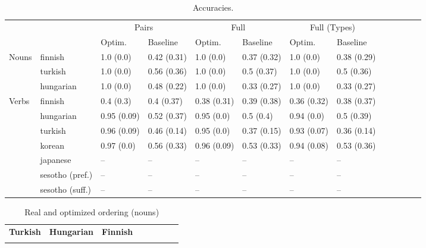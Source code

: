 \documentclass[11pt,letterpaper]{article}
\begin{document}
\begin{table}[]
    \centering
    \begin{tabular}{l|l|ll|lllllllll}
    &     &    \multicolumn{2}{c|}{Pairs} & \multicolumn{2}{c|}{Full} & \multicolumn{2}{c}{Full (Types)} \\
     &   &     Optim. & Baseline & Optim. & Baseline & Optim. & Baseline \\ \hline
Nouns & finnish  & 1.0 (0.0) & 0.42 (0.31) & 1.0 (0.0) & 0.37 (0.32) & 1.0 (0.0) & 0.38 (0.29) \\
 & turkish  & 1.0 (0.0) & 0.56 (0.36) & 1.0 (0.0) & 0.5 (0.37) & 1.0 (0.0) & 0.5 (0.36) \\
 & hungarian  & 1.0 (0.0) & 0.48 (0.22) & 1.0 (0.0) & 0.33 (0.27) & 1.0 (0.0) & 0.33 (0.27) \\
 \hline
Verbs & finnish  & 0.4 (0.3) & 0.4 (0.37) & 0.38 (0.31) & 0.39 (0.38) & 0.36 (0.32) & 0.38 (0.37) \\
 & hungarian  & 0.95 (0.09) & 0.52 (0.37) & 0.95 (0.0) & 0.5 (0.4) & 0.94 (0.0) & 0.5 (0.39) \\
 & turkish  & 0.96 (0.09) & 0.46 (0.14) & 0.95 (0.0) & 0.37 (0.15) & 0.93 (0.07) & 0.36 (0.14) \\
 & korean & 0.97 (0.0) & 0.56 (0.33) & 0.96 (0.09) & 0.53 (0.33) & 0.94 (0.08) & 0.53 (0.36) \\
 & japanese & -- & -- & -- & -- & -- & -- \\
 & sesotho (pref.) & -- & -- & -- & -- & -- & -- \\
 & sesotho (suff.) & -- & -- & -- & -- & -- & -- \\
    \end{tabular}
    \caption{Accuracies. }
    \label{tab:my_label}
\end{table}



\begin{table}[]
\begin{tabular}{cccccccc}
\textbf{Turkish} & \textbf{Hungarian} & \textbf{Finnish} \\
\begin{minipage}{.3\textwidth}
  
    \end{minipage}
  &
  \begin{minipage}{.3\textwidth}
  
    \end{minipage}
  &
  \begin{minipage}{.3\textwidth}
  
  \end{minipage}
  \end{tabular}
  
    \caption{Real and optimized ordering (nouns)}
    \label{tab:my_label}
\end{table}
\end{document}
